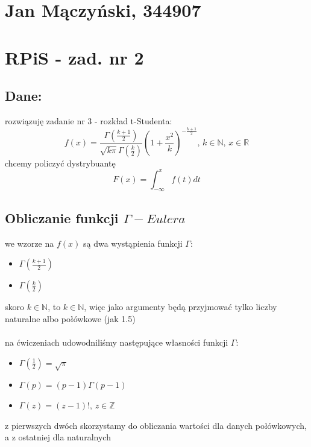 \documentclass{article}
\begin{document}
\section*{Jan Mączyński, 344907}

\section*{RPiS - zad. nr 2}

\subsection*{Dane:}
rozwiązuję zadanie nr 3 - rozkład t-Studenta:
\[f(x) = \frac{\Gamma(\frac{k+1}{2})}{\sqrt{k\pi} \Gamma(\frac{k}{2})}
(1 + \frac{x^2}{k})^{-\frac{k+1}{2}},
\,k\in\mathbb{N},\,x\in\mathbb{R}\]
chcemy policzyć dystrybuantę
\[F(x) = \int_{-\infty}^{x} f(t)dt\]

\subsection*{Obliczanie funkcji $\Gamma-Eulera$}
we wzorze na $f(x)$ są dwa wystąpienia funkcji $\Gamma$:
\begin{itemize}
    \item $\Gamma(\frac{k+1}{2})$
    \item $\Gamma(\frac{k}{2})$
\end{itemize}
skoro $k\in\mathbb{N}$, to $k\in\mathbb{N}$, więc jako argumenty będą przyjmować
tylko liczby naturalne albo połówkowe (jak 1.5)\\\\
na ćwiczeniach udowodniliśmy następujące własności funkcji $\Gamma$:
\begin{itemize}
    \item $\Gamma(\frac{1}{2}) = \sqrt{\pi}$
    \item $\Gamma(p) = (p - 1)\Gamma(p - 1)$
    \item $\Gamma(z) = (z - 1)!,\,z\in\mathbb{Z}$
\end{itemize}
z pierwszych dwóch skorzystamy do obliczania wartości dla danych połówkowych,
a z ostatniej dla naturalnych
\end{document}
